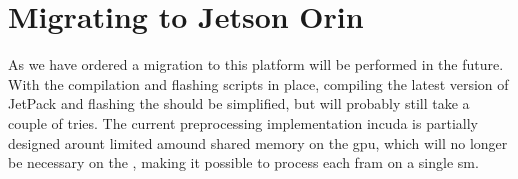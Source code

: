 \section{Migrating to Jetson Orin}
As we have ordered a \jo migration to this platform will be performed in the future.
With the compilation and flashing scripts in place, compiling the latest version of JetPack and flashing the \jo should be simplified, but will probably still take a couple of tries.
The current preprocessing implementation in\gls{cuda} is partially designed arount limited amound shared memory on the \jx \gls{gpu}, which will no longer be necessary on the \jo, making it possible to process each fram on a single \gls{sm}.


